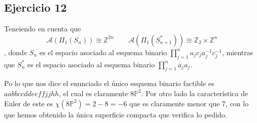 \documentclass{article}
\begin{document}
\subsection{Ejercicio 12}
Teneiendo en cuenta que 
\begin{equation*}
\mathcal{A}(\Pi_1(S_n))\cong \mathbb{Z}^{2n}\qquad \mathcal{A}(\Pi_1(S^*_{n+1}))\cong\mathbb{Z}_2\times \mathbb{Z}^n
\end{equation*}
, donde $S_n$ es el espacio asociado al esquema binario $\prod_{j=1}^n a_jc_ja_j^{-1}c_j^{-1}$, mientras que $S^*_n$ es el espacio asociado al esquema binario $\prod_{j=1}^n a_ja_j$.

Po lo que nos dice el enunciado el único esquema binario factible es $aabbccddeeffjjhh$, el cual es claramente $8\mathbb{P}^2$. Por otro lado la característica de Euler de este es $\chi(8\mathbb{P}^2)=2-8=-6$ que es claramente menor que 7, con lo que hemos obtenido la única superficie compacta que verifica lo pedido.
\end{document}
